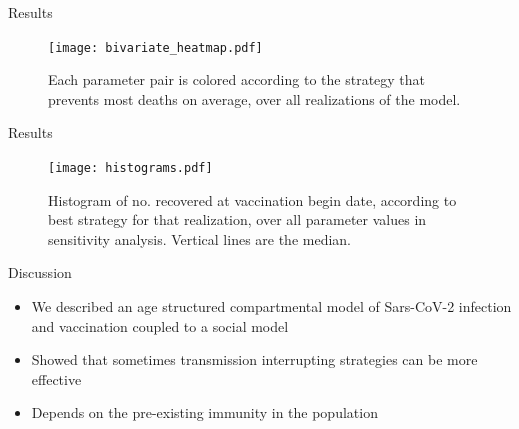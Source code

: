 \documentclass{beamer}
\begin{document}
\begin{frame}{Results}
    \begin{figure}
        \texttt{[image: bivariate\_heatmap.pdf]}
        
        \caption{Each parameter pair is colored according to the strategy that prevents most deaths on average, over all realizations of the model.}
    \end{figure}
\end{frame}

\begin{frame}{Results}
\begin{figure}
    \texttt{[image: histograms.pdf]}
    \caption{Histogram of no. recovered at vaccination begin date, according to best strategy for that realization, over all parameter values in sensitivity analysis. Vertical lines are the median.}
\end{figure}
\end{frame}
\begin{frame}{Discussion}
    \begin{itemize}
        \item We described an age structured compartmental model of Sars-CoV-2 infection and vaccination coupled to a social model 
        \item Showed that sometimes transmission interrupting strategies can be more effective
        \item Depends on the pre-existing immunity in the population
    \end{itemize}
\end{frame}
\begin{frame}
    
    
\end{frame}
\end{document}
